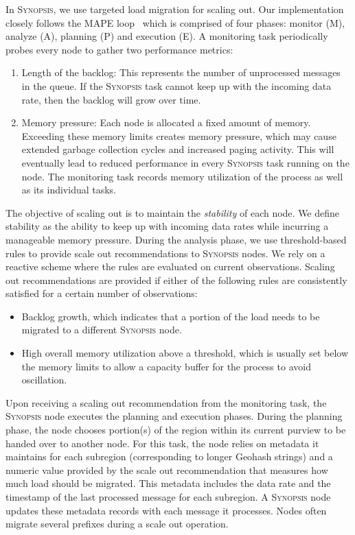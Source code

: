 In \textsc{Synopsis}, we use targeted load migration for scaling out.
Our implementation closely follows the MAPE loop~\cite{maurer2011revealing} which is comprised of four phases: monitor (M), analyze (A), planning (P) and execution (E).
A monitoring task periodically probes every node to gather two performance metrics:
\begin{enumerate}[leftmargin=*]
	\item Length of the backlog: This represents the number of unprocessed messages in the queue. If the \textsc{Synopsis} task cannot keep up with the incoming data rate, then the backlog will grow over time.
	\item Memory pressure: Each node is allocated a fixed amount of memory. 
	Exceeding these memory limits creates memory pressure, which may cause extended garbage collection cycles and increased paging activity. 
	This will eventually lead to reduced performance in every \textsc{Synopsis} task running on the node.
	The monitoring task records memory utilization of the process as well as its individual tasks.
\end{enumerate} 

The objective of scaling out is to maintain the \emph{stability} of each node.
We define stability as the ability to keep up with incoming data rates while incurring a manageable memory pressure.  During the analysis phase, we use threshold-based rules \cite{lorido2012auto} to provide scale out recommendations to \textsc{Synopsis} nodes.
We rely on a reactive scheme where the rules are evaluated on current observations.
Scaling out recommendations are provided if either of the following rules are consistently satisfied for a certain number of observations:
\begin{itemize}[leftmargin=*]  
\item Backlog growth, which indicates that a portion of the load needs to be migrated to a different \textsc{Synopsis} node.
\item High overall memory utilization above a threshold, which is usually set below the memory limits to allow a capacity buffer for the process to avoid oscillation.
\end{itemize}

Upon receiving a scaling out recommendation from the monitoring task, the \textsc{Synopsis} node executes the planning and execution phases.
During the planning phase, the node chooses portion(s) of the region within its current purview to be handed over to another node.
For this task, the node relies on metadata it maintains for each subregion (corresponding to longer Geohash strings) and a numeric value provided by the scale out recommendation that measures how much load should be migrated.
This metadata includes the data rate and the timestamp of the last processed message for each subregion.
A \textsc{Synopsis} node updates these metadata records with each message it processes.
Nodes often migrate several prefixes during a scale out operation.

